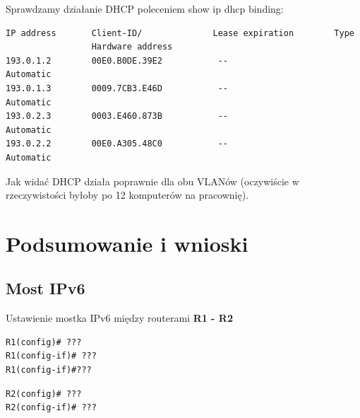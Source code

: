 \documentclass[11pt,a4paper]{article}
\begin{document}
Sprawdzamy działanie DHCP poleceniem show ip dhcp binding:
\begin{lstlisting}
IP address       Client-ID/              Lease expiration        Type
                 Hardware address
193.0.1.2        00E0.B0DE.39E2           --                     Automatic
193.0.1.3        0009.7CB3.E46D           --                     Automatic
193.0.2.3        0003.E460.873B           --                     Automatic
193.0.2.2        00E0.A305.48C0           --                     Automatic
\end{lstlisting}
Jak widać DHCP działa poprawnie dla obu VLANów (oczywiście w rzeczywistości byłoby po 12 komputerów na pracownię).
\section{Podsumowanie i wnioski}

\subsection{Most IPv6}

\noindent
Ustawienie mostka IPv6 między routerami {\bf R1 - R2}
\begin{lstlisting}
R1(config)# ???
R1(config-if)# ???
R1(config-if)#???
\end{lstlisting}

\begin{lstlisting}
R2(config)# ???
R2(config-if)# ???
\end{lstlisting}
\end{document}
